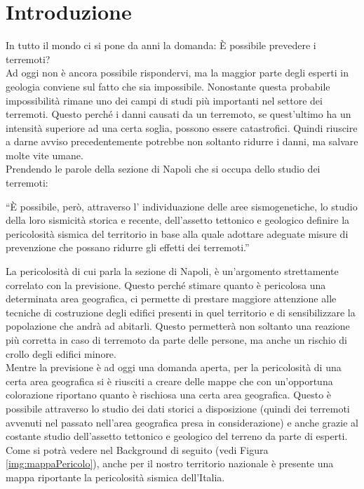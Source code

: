 \chapter*{Introduzione}

In tutto il mondo ci si pone da anni la domanda: \`E possibile prevedere i terremoti?\\
Ad oggi non \`e ancora possibile rispondervi, ma la maggior parte degli esperti in geologia conviene sul fatto che sia impossibile. Nonostante questa probabile impossibilit\`a rimane uno dei campi di studi pi\`u importanti nel settore dei terremoti. Questo perch\'e i danni causati da un terremoto, se quest'ultimo ha un intensit\`a superiore ad una certa soglia, possono essere catastrofici. Quindi riuscire a darne avviso precedentemente potrebbe non soltanto ridurre i danni, ma salvare molte vite umane.\\
Prendendo le parole della sezione di Napoli che si occupa dello studio dei terremoti: \begin{displayquote}
``\`E possibile, per\`o, attraverso l' individuazione delle aree sismogenetiche, lo studio della loro sismicit\`a storica e recente, dell'assetto tettonico e geologico definire la pericolosit\`a sismica del territorio in base alla quale adottare adeguate misure di prevenzione che possano ridurre gli effetti dei terremoti.''
\end{displayquote}
La pericolosit\`a di cui parla la sezione di Napoli, \`e un'argomento strettamente correlato con la previsione. Questo perch\'e stimare quanto \`e pericolosa una determinata area geografica, ci permette di prestare maggiore attenzione alle tecniche di costruzione degli edifici presenti in quel territorio e di sensibilizzare la popolazione che andr\`a ad abitarli. Questo permetter\`a non soltanto una reazione pi\`u corretta in caso di terremoto da parte delle persone, ma anche un rischio di crollo degli edifici minore.\\
Mentre la previsione \`e ad oggi una domanda aperta, per la pericolosit\`a di una certa area geografica si \`e riusciti a creare delle mappe che con un'opportuna colorazione riportano quanto \`e rischiosa una certa area geografica. Questo \`e possibile attraverso lo studio dei dati storici a disposizione (quindi dei terremoti avvenuti nel passato nell'area geografica presa in considerazione) e anche grazie al costante studio dell'assetto tettonico e geologico del terreno da parte di esperti. Come si potr\`a vedere nel Background di seguito (vedi Figura \ref{img:mappaPericolo}), anche per il nostro territorio nazionale \`e presente una mappa riportante la pericolosit\`a sismica dell'Italia.\\
